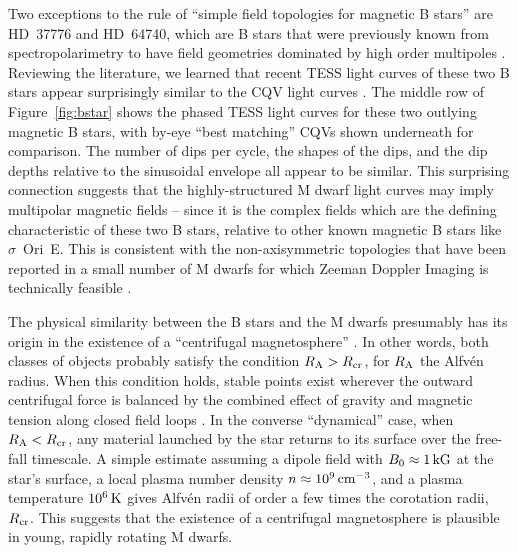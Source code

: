 \documentclass[11pt,twocolumn,tighten]{aastex63}
\begin{document}
Two exceptions to the rule of ``simple field topologies for magnetic B
stars'' are HD~37776 and HD~64740, which are B stars that were
previously known from spectropolarimetry to have field geometries
dominated by high order multipoles \citep{2011ApJ...726...24K}.
Reviewing the literature, we learned that recent TESS light curves of
these two B stars appear surprisingly similar to the CQV light curves
\citep{2020pase.conf...46M}.  The middle row of Figure~\ref{fig:bstar}
shows the phased TESS light curves for these two outlying magnetic B
stars, with by-eye ``best matching'' CQVs shown underneath for comparison.  The
number of dips per cycle, the shapes of the dips, and the dip depths
relative to the sinusoidal envelope all appear to be similar.  This surprising connection 
suggests that the
highly-structured M dwarf light curves may imply multipolar magnetic
fields -- since it is the complex fields which are the defining
characteristic of these two B stars, relative to other known magnetic
B stars like $\sigma$~Ori~E.  This is consistent with the
non-axisymmetric topologies that have been reported in a small number
of M dwarfs for which Zeeman Doppler Imaging is technically feasible
\citep[see][and references therein]{2021A&ARv..29....1K}.

The physical similarity between the B stars and the M dwarfs
presumably has its origin in the existence of a ``centrifugal
magnetosphere'' \citep[see][]{2013MNRAS.429..398P}.  In other words,
both classes of objects probably satisfy the condition $R_{\rm A} >
R_{\rm cr}$, for $R_{\rm A}$ the Alfv\'en radius.  When this condition
holds, stable points exist wherever the outward centrifugal force is
balanced by the combined effect of gravity and magnetic tension along
closed field loops \citep{1985Ap&SS.116..285N}.  In the converse
``dynamical'' case, when  $R_{\rm A} < R_{\rm cr}$, any material
launched by the star returns to its surface over the free-fall
timescale.  A simple estimate assuming a dipole
field with $B_0\approx1\,{\rm kG}$ at the star's surface, a local
plasma number density $n\approx10^9\,{\rm cm^{-3}}$, and a plasma
temperature $10^6\,{\rm K}$ gives Alfv\'en radii of order a few times
the corotation radii, $R_{\rm cr}$.  This suggests that the existence
of a centrifugal magnetosphere is plausible in young, rapidly rotating
M dwarfs.


\end{document}
